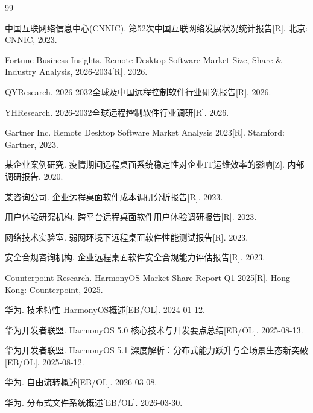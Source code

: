 \documentclass[12pt,a4paper]{article}
\begin{document}
\begin{thebibliography}{99}


中国互联网络信息中心(CNNIC). 第52次中国互联网络发展状况统计报告[R]. 北京: CNNIC, 2023.

Fortune Business Insights. Remote Desktop Software Market Size, Share \& Industry Analysis, 2026-2034[R]. 2026.

QYResearch. 2026-2032全球及中国远程控制软件行业研究报告[R]. 2026.

YHResearch. 2026-2032全球远程控制软件行业调研[R]. 2026.

Gartner Inc. Remote Desktop Software Market Analysis 2023[R]. Stamford: Gartner, 2023.

某企业案例研究. 疫情期间远程桌面系统稳定性对企业IT运维效率的影响[Z]. 内部调研报告, 2020.

某咨询公司. 企业远程桌面软件成本调研分析报告[R]. 2023.

用户体验研究机构. 跨平台远程桌面软件用户体验调研报告[R]. 2023.

网络技术实验室. 弱网环境下远程桌面软件性能测试报告[R]. 2023.

安全合规咨询机构. 企业远程桌面软件安全合规能力评估报告[R]. 2023.

Counterpoint Research. HarmonyOS Market Share Report Q1 2025[R]. Hong Kong: Counterpoint, 2025.

华为. 技术特性-HarmonyOS概述[EB/OL]. 2024-01-12.

华为开发者联盟. HarmonyOS 5.0 核心技术与开发要点总结[EB/OL]. 2025-08-13.

华为开发者联盟. HarmonyOS 5.1 深度解析：分布式能力跃升与全场景生态新突破[EB/OL]. 2025-08-12.

华为. 自由流转概述[EB/OL]. 2026-03-08.

华为. 分布式文件系统概述[EB/OL]. 2026-03-30.


\end{thebibliography}
\end{document}
